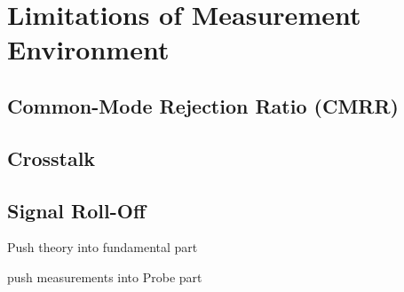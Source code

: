 
\chapter{Limitations of Measurement Environment}

\section{Common-Mode Rejection Ratio (CMRR)}
\section{Crosstalk}
\section{Signal Roll-Off}

Push theory into fundamental part 

push measurements into Probe part


